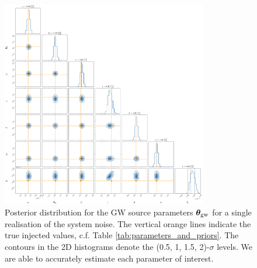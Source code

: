 \documentclass[fleqn,usenatbib,useAMS]{mnras}
\begin{document}
\begin{figure}
	\includegraphics[width=0.8\textwidth, height =0.8\textwidth ]{images/1237_broad_GW}
	\caption{Posterior distribution for the GW source parameters $\boldsymbol{\theta}_{\rm gw}$ for a single realisation of the system noise. The vertical orange lines indicate the true injected values, c.f. Table \ref{tab:parameters_and_priors}. The contours in the 2D histograms denote the (0.5, 1, 1.5, 2)-$\sigma$ levels. We are able to accurately estimate each parameter of interest.}
	\label{fig:corner_plot_1}
\end{figure}
\end{document}
